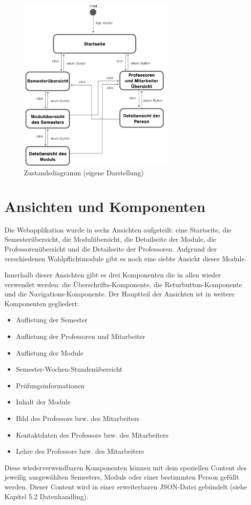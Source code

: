\documentclass[12pt,					%
							 oneside,			%
							 a4paper,			%
							 halfparskip,		%
							 liststotoc,			%
							 bibtotoc,			%
							 fleqn,				%
							 pointlessnumbers]	%
							 {scrreprt}
\begin{document}
		\begin{figure}[h]
			\centering
			\includegraphics[width=0.7\textwidth]{pictures/zustandsdiagram.png}
			\caption{Zustandsdiagramm (eigene Darstellung)}						
			\label{Zustandsdiagramm}
		\end{figure}
					
		\section{Ansichten und Komponenten}	
		 Die Webapplikation wurde in sechs Ansichten aufgeteilt: eine Startseite, die Semesterübersicht, die Modulübersicht, die Detailseite der Module, die Professorenübersicht und die Detailseite der Professoren. Aufgrund der verschiedenen Wahlpflichtmodule gibt es noch eine siebte Ansicht dieser Module.
	
Innerhalb dieser Ansichten gibt es drei Komponenten die in allen wieder verwendet werden: die Überschrifts-Komponente, die Returbutton-Komponente und die Navigations-Komponente. Der Hauptteil der Ansichten ist in weitere Komponenten gegliedert:
	\begin{itemize}
		\item Auflistung der Semester
		\item Auflistung der Professoren und Mitarbeiter
		\item Auflistung der Module
		\item Semester-Wochen-Stundenübersicht
		\item Prüfungsinformationen
		\item Inhalt der Module
		\item Bild des Professors bzw. des Mitarbeiters
		\item Kontaktdaten des Professors bzw. des Mitarbeiters
		\item Lehre des Professors bzw. des Mitarbeiters
	\end{itemize}	
Diese wiederverwendbaren Komponenten können mit dem speziellen Content des jeweilig ausgewählten Semesters, Moduls oder einer bestimmten Person gefüllt werden. Dieser Content wird in einer erweiterbaren JSON-Datei gebündelt (siehe Kapitel 5.2 Datenhandling).
\end{document}
